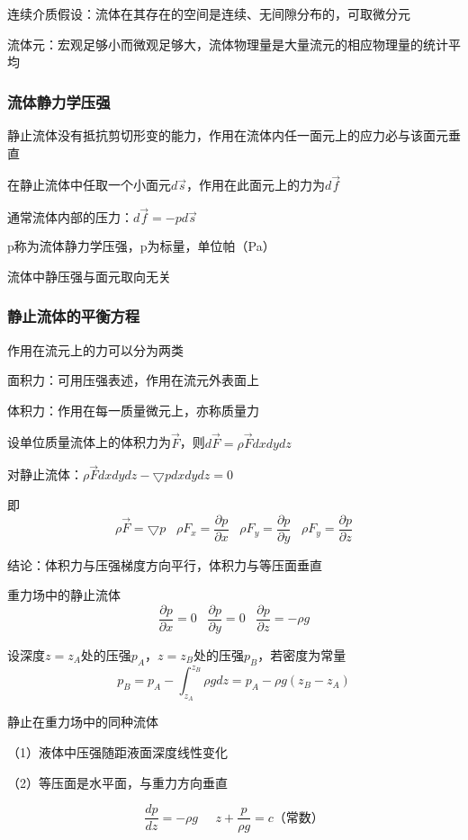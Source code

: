 \documentclass[UTF8]{article}
\begin{document}
    连续介质假设：流体在其存在的空间是连续、无间隙分布的，可取微分元

    流体元：宏观足够小而微观足够大，流体物理量是大量流元的相应物理量的统计平均

\subsubsection{流体静力学压强}

    静止流体没有抵抗剪切形变的能力，作用在流体内任一面元上的应力必与该面元垂直

    在静止流体中任取一个小面元$d\vec{s}$，作用在此面元上的力为$d\vec{f}$

    $\mbox{通常流体内部的压力：}d\vec{f} = -pd\vec{s}$

    p称为流体静力学压强，p为标量，单位帕（Pa）

    流体中静压强与面元取向无关

\subsubsection{静止流体的平衡方程}

    作用在流元上的力可以分为两类

    面积力：可用压强表述，作用在流元外表面上

    体积力：作用在每一质量微元上，亦称质量力

    设单位质量流体上的体积力为$\vec{F}$，则$d\vec{F} = \rho \vec{F}dxdydz$

    对静止流体：$\rho \vec{F}dxdydz - \bigtriangledown pdxdydz = 0$

    即\[\rho \vec{F} = \bigtriangledown p\;\;\;\rho F_x = \frac{\partial p}{\partial x}\;\;\;\rho F_y = \frac{\partial p}{\partial y}\;\;\;\rho F_y = \frac{\partial p}{\partial z}\]

    结论：体积力与压强梯度方向平行，体积力与等压面垂直

    重力场中的静止流体\[\frac{\partial p}{\partial x} = 0\;\;\;\frac{\partial p}{\partial y} = 0\;\;\;\frac{\partial p}{\partial z} = -\rho g\]

    设深度$z = z_A$处的压强$p_A$，$z = z_B$处的压强$p_B$，若密度为常量
    \[p_B = p_A - \int_{z_A}^{z_B}\rho gdz = p_A - \rho g(z_B - z_A)\]

    静止在重力场中的同种流体

    \;\;（1）液体中压强随距液面深度线性变化

    \;\;（2）等压面是水平面，与重力方向垂直

    \[\frac{dp}{dz} = -\rho g\;\;\;\;\;z + \frac{p}{\rho g} = c\mbox{（常数）}\]
\end{document}

